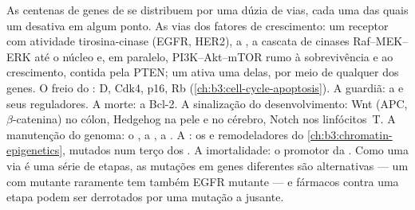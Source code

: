 \begin{proposition}\label{prop:b3:cancer-biology:pathways}
As centenas de genes de  se distribuem por uma dúzia de vias,
cada uma das quais um  desativa em algum ponto. As vias dos
fatores de crescimento: um receptor com atividade tirosina-cinase
(EGFR, HER2), a , a cascata de cinases Raf--MEK--ERK até o núcleo e,
em paralelo, PI3K--Akt--mTOR rumo à sobrevivência e ao crescimento,
contida pela PTEN; um  ativa uma delas, por meio de qualquer dos
genes. O freio do :  D, Cdk4, p16, Rb
(\cref{ch:b3:cell-cycle-apoptosis}). A guardiã: a  e seus
reguladores. A morte: a Bcl-2. A sinalização do desenvolvimento: Wnt
(APC, $\beta$-catenina) no cólon, Hedgehog na pele e no cérebro, Notch
nos linfócitos~T. A manutenção do genoma: o , a
, a . A : os  e remodeladores do
\cref{ch:b3:chromatin-epigenetics}, mutados num terço dos . A
imortalidade: o promotor da . Como uma via é uma série de
etapas, as mutações em genes diferentes são alternativas --- um 
com  mutante raramente tem também EGFR mutante --- e fármacos contra
uma etapa podem ser derrotados por uma mutação a jusante.
\end{proposition}

